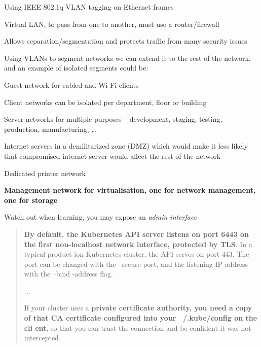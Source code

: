 \documentclass[Screen16to9,17pt]{foils}
\begin{document}


\begin{list1}
\item Using IEEE 802.1q  VLAN tagging on Ethernet frames
\item Virtual LAN, to pass from one to another, must use a router/firewall
\item Allows separation/segmentation and protects traffic from many security issues
\end{list1}


Using VLANs to segment networks we can extend it to the rest of the network, and an example of isolated segments could be:
\begin{list2}
\item Guest network for cabled and Wi-Fi clients
\item Client networks can be isolated per department, floor or building
\item Server networks for multiple purposes – development, staging, testing, production, manufacturing, …
\item Internet servers in a demilitarized zone (DMZ) which would make it less likely that compromised internet
server would affect the rest of the network
\item Dedicated printer network
\item \textbf{Management network for virtualisation, one for network management, one for storage}
\end{list2}




Watch out when learning, you may expose an \emph{admin interface}
\begin{quote}{\bf
By default, the Kubernetes API server listens on port 6443 on the first non-localhost network interface, protected by TLS}. In a typical product
ion Kubernetes cluster, the API serves on port 443. The port can be changed with the --secure-port, and the listening IP address with the --bind
-address flag.

...

If your cluster uses a {\bf private certificate authority, you need a copy of that CA certificate configured into your ~/.kube/config on the cli
ent}, so that you can trust the connection and be confident it was not intercepted.
\end{quote}
\end{document}
